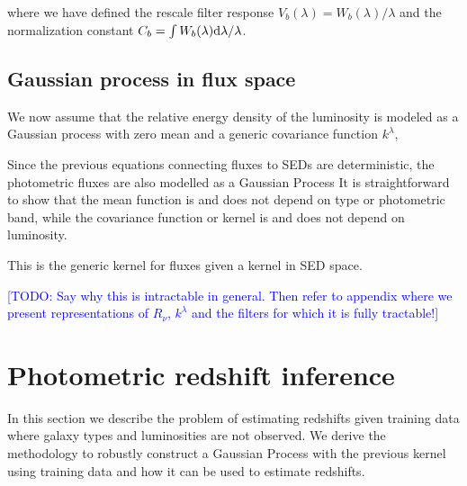\documentclass[aps,prd,showpacs,superscriptaddress,groupedaddress]{revtex4}  %
\newcommand{\todo}[1]{\textcolor{blue}{[TODO: #1]}}
\begin{document}
where we have defined the rescale filter response $V_b(\lambda) = W_b(\lambda)/\lambda$ and the normalization constant $C_b = \int W_b(\lambda) \mathrm{d}\lambda / \lambda$.

\subsection{Gaussian process in flux space}

We now assume that the relative energy density of the luminosity is modeled as a Gaussian process with zero mean and a generic covariance function $k^\lambda$,
	
Since the previous equations connecting fluxes to SEDs are deterministic, the photometric fluxes are also modelled as a Gaussian Process 
It is straightforward to show that the mean function is
and does not depend on type or photometric band, while the covariance function or kernel is
and does not depend on luminosity.

This is the generic kernel for fluxes given a kernel in SED space.

\todo{Say why this is intractable in general. Then refer to appendix where we present representations of $R_\nu$, $k^\lambda$ and the filters for which it is fully tractable!}



\section{Photometric redshift inference}

In this section we describe the problem of estimating redshifts given training data where galaxy types and luminosities are not observed.
We derive the methodology to robustly construct a Gaussian Process with the previous kernel using training data and how it can be used to estimate redshifts.
\end{document}
